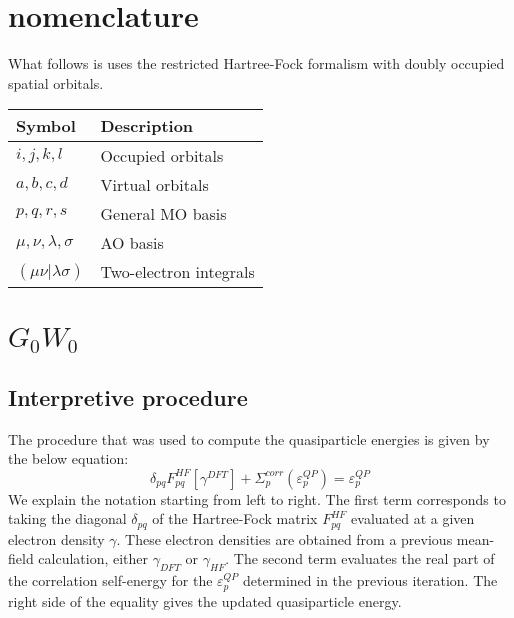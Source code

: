 \documentclass[12pt]{caltech_thesis}
\begin{document}
\tableofcontents
\listoffigures
\listoftables
\printnomenclature

\mainmatter

\chapter{nomenclature}
What follows is uses the restricted Hartree-Fock formalism with doubly occupied spatial orbitals.
\begin{tabular}{p{} p{}}
Symbol & Description \\
\hline
\(i,j,k,l\) & Occupied orbitals \\
\(a,b,c,d\) & Virtual orbitals \\
\(p,q,r,s\) & General MO basis \\
\(\mu,\nu,\lambda,\sigma\) & AO basis \\
\((\mu\nu|\lambda\sigma)\) & Two-electron integrals \\

\end{tabular}





\chapter{$G_0W_0$}
\section{Interpretive procedure}
The procedure that was used to compute the quasiparticle energies is given by the below equation:
\begin{equation}
    \delta_{pq}F_{pq}^{HF}[\gamma^{DFT}] + \Sigma_{p}^{corr}(\varepsilon_{p}^{QP}) = \varepsilon_{p}^{QP}
\end{equation}
We explain the notation starting from left to right. The first term corresponds to taking the diagonal $\delta_{pq}$ of the Hartree-Fock matrix $F_{pq}^{HF}$ evaluated at a given electron density $\gamma$. These electron densities are obtained from a previous mean-field calculation, either $\gamma_{DFT}$ or $\gamma_{HF}$. The second term evaluates the real part of the correlation self-energy for the $\varepsilon_{p}^{QP}$ determined in the previous  iteration. The right side of the equality gives the updated quasiparticle energy.
\end{document}

